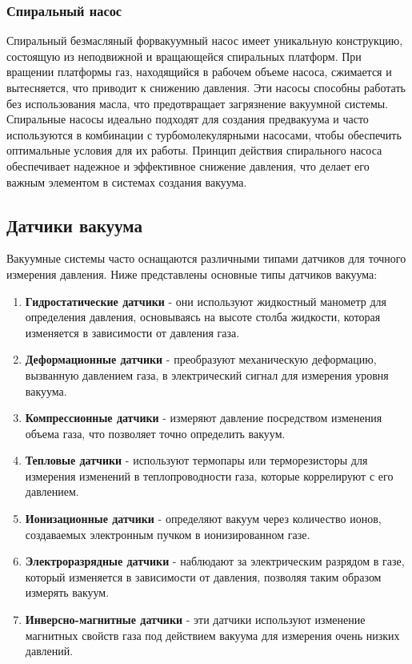 \documentclass[12pt,oneside,a4paper]{article}
\begin{document}
\subsubsection{Спиральный насос}
Спиральный безмасляный форвакуумный насос имеет уникальную конструкцию, состоящую из неподвижной и вращающейся спиральных платформ. При вращении платформы газ, находящийся в рабочем объеме насоса, сжимается и вытесняется, что приводит к снижению давления. Эти насосы способны работать без использования масла, что предотвращает загрязнение вакуумной системы. Спиральные насосы идеально подходят для создания предвакуума и часто используются в комбинации с турбомолекулярными насосами, чтобы обеспечить оптимальные условия для их работы. Принцип действия спирального насоса обеспечивает надежное и эффективное снижение давления, что делает его важным элементом в системах создания вакуума.


\subsection{Датчики вакуума}

Вакуумные системы часто оснащаются различными типами датчиков для точного измерения давления. Ниже представлены основные типы датчиков вакуума:

\begin{enumerate}
    \item \textbf{Гидростатические датчики} - они используют жидкостный манометр для определения давления, основываясь на высоте столба жидкости, которая изменяется в зависимости от давления газа.
    \item \textbf{Деформационные датчики} - преобразуют механическую деформацию, вызванную давлением газа, в электрический сигнал для измерения уровня вакуума.
    \item \textbf{Компрессионные датчики} - измеряют давление посредством изменения объема газа, что позволяет точно определить вакуум.
    \item \textbf{Тепловые датчики} - используют термопары или терморезисторы для измерения изменений в теплопроводности газа, которые коррелируют с его давлением.
    \item \textbf{Ионизационные датчики} - определяют вакуум через количество ионов, создаваемых электронным пучком в ионизированном газе.
    \item \textbf{Электроразрядные датчики} - наблюдают за электрическим разрядом в газе, который изменяется в зависимости от давления, позволяя таким образом измерять вакуум.
    \item \textbf{Инверсно-магнитные датчики} - эти датчики используют изменение магнитных свойств газа под действием вакуума для измерения очень низких давлений.
\end{enumerate}
\end{document}
